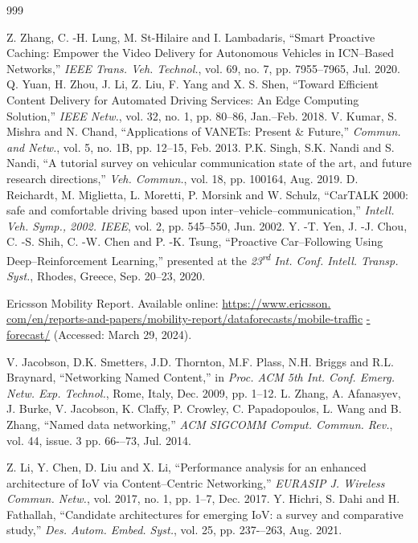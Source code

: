 \documentclass[journal]{IEEEtran}
\begin{document}
\begin{thebibliography}{999} %

 Z. Zhang, C. -H. Lung, M. St-Hilaire and I. Lambadaris,  ``Smart Proactive Caching: Empower the Video Delivery for Autonomous Vehicles in ICN--Based Networks,'' \emph{IEEE Trans. Veh. Technol.}, vol. 69, no. 7, pp. 7955--7965, Jul. 2020.
 Q. Yuan, H. Zhou, J. Li, Z. Liu, F. Yang and X. S. Shen,  ``Toward Efficient Content Delivery for Automated Driving Services: An Edge Computing Solution,'' \emph{IEEE Netw.}, vol. 32, no. 1, pp. 80--86, Jan.--Feb. 2018.
 V. Kumar, S. Mishra and N. Chand,  ``Applications of VANETs: Present \& Future,'' \emph{Commun. and Netw.}, vol. 5, no. 1B, pp. 12--15, Feb. 2013.
 P.K. Singh, S.K. Nandi and S. Nandi,  ``A tutorial survey on vehicular communication state of the art, and future research directions,'' \emph{Veh. Commun.}, vol. 18, pp. 100164, Aug. 2019.
 D. Reichardt, M. Miglietta, L. Moretti, P. Morsink and W. Schulz,  ``CarTALK 2000: safe and comfortable driving based upon inter--vehicle--communication,'' \emph{Intell. Veh. Symp., 2002. IEEE}, vol. 2, pp. 545--550, Jun. 2002.
 Y. -T. Yen, J. -J. Chou, C. -S. Shih, C. -W. Chen and P. -K. Tsung,  ``Proactive Car--Following Using Deep--Reinforcement Learning,'' presented at the \emph{23\textsuperscript{rd} Int. Conf. Intell. Transp. Syst.}, Rhodes, Greece, Sep. 20--23, 2020.

 Ericsson Mobility Report. Available online: \url{https://www.ericsson.}
\url{com/en/reports-and-papers/mobility-report/dataforecasts/mobile-traffic}
\url{-forecast/} (Accessed: March 29, 2024).

 V. Jacobson, D.K. Smetters, J.D. Thornton, M.F. Plass, N.H. Briggs and R.L. Braynard,  ``Networking Named Content,'' in \emph{Proc. ACM 5th Int. Conf. Emerg. Netw. Exp. Technol.}, Rome, Italy, Dec. 2009, pp. 1--12.
 L. Zhang, A. Afanasyev, J. Burke, V. Jacobson, K. Claffy, P. Crowley, C. Papadopoulos, L. Wang and B. Zhang, ``Named data networking,'' \emph{ACM SIGCOMM Comput. Commun. Rev.}, vol. 44, issue. 3 pp. 66-–73, Jul. 2014.

 Z. Li, Y. Chen, D. Liu and X. Li, ``Performance analysis for an enhanced architecture of IoV via Content--Centric Networking,'' \emph{EURASIP J. Wireless Commun. Netw.}, vol. 2017, no. 1, pp. 1--7, Dec. 2017.
 Y. Hichri, S. Dahi and H. Fathallah, ``Candidate architectures for emerging IoV: a survey and comparative study,'' \emph{Des. Autom. Embed. Syst.}, vol. 25, pp. 237-–263, Aug. 2021.


\end{thebibliography}
\end{document}
